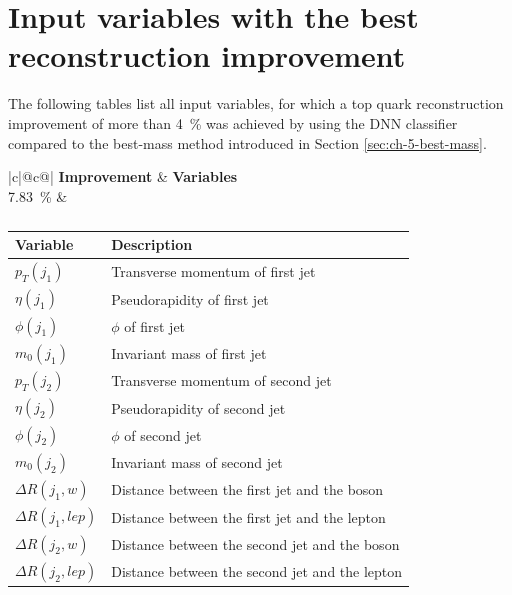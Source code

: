 \chapter{Input variables with the best reconstruction improvement}
The following tables list all input variables, for which a top quark reconstruction improvement of more than \SI{4}{\%} was achieved by using the DNN classifier compared to the best-mass method introduced in Section \ref{sec:ch-5-best-mass}.

\begin{table}[h]
    \centering
    \label{tab:app_vars_1}
    \caption{}
    \begin{tabular}{ |c|@{}c@{}| }
        \hline
        \textbf{Improvement} & \textbf{Variables}\\
        \hline
        \SI{7.83}{\%} & 
        \begin{tabular}{ll}
            \hline
            Variable & Description\\
            \hline
            $p_T(j_1)$ & Transverse momentum of first jet\\
            $\eta(j_1)$ & Pseudorapidity of first jet\\
            $\phi(j_1)$ & $\phi$ of first jet\\
            $m_0(j_1)$ & Invariant mass of first jet\\

            $p_T(j_2)$ & Transverse momentum of second jet\\
            $\eta(j_2)$ & Pseudorapidity of second jet\\
            $\phi(j_2)$ & $\phi$ of second jet\\
            $m_0(j_2)$ & Invariant mass of second jet\\

            $\Delta R(j_1, w)$ & Distance between the first jet and the \PWplus boson\\
            $\Delta R(j_1, lep)$ & Distance between the first jet and the lepton\\
            $\Delta R(j_2, w)$ & Distance between the second jet and the \PWplus boson\\
            $\Delta R(j_2, lep)$ & Distance between the second jet and the lepton\\
            \hline
        \end{tabular}\\
        \hline
    \end{tabular}
\end{table}

